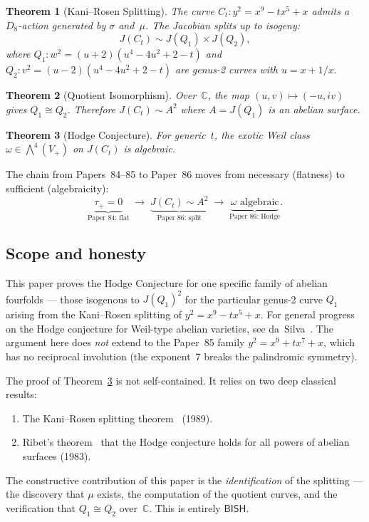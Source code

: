 \documentclass[11pt]{article}
\theoremstyle{plain}
\newtheorem{theorem}{Theorem}[section]
\theoremstyle{definition}
\theoremstyle{remark}
\newcommand{\C}{\mathbb{C}}
\newcommand{\BISH}{\ensuremath{\mathsf{BISH}}}
\begin{document}
\begin{theorem}[Kani--Rosen Splitting]\label{thm:A}
The curve $C_t\colon y^2 = x^9 - tx^5 + x$ admits a $D_8$-action
generated by $\sigma$ and~$\mu$.  The Jacobian splits up to isogeny:
\[
  J(C_t) \sim J(Q_1) \times J(Q_2),
\]
where $Q_1\colon w^2 = (u+2)(u^4 - 4u^2 + 2 - t)$ and
$Q_2\colon v^2 = (u-2)(u^4 - 4u^2 + 2 - t)$ are genus-2 curves
with $u = x + 1/x$.
\end{theorem}

\begin{theorem}[Quotient Isomorphism]\label{thm:B}
Over~$\C$, the map $(u,v) \mapsto (-u, iv)$ gives $Q_1 \cong Q_2$.
Therefore $J(C_t) \sim A^2$ where $A = J(Q_1)$ is an abelian surface.
\end{theorem}

\begin{theorem}[Hodge Conjecture]\label{thm:C}
For generic~$t$, the exotic Weil class
$\omega \in \bigwedge^4(V_+)$ on $J(C_t)$ is algebraic.
\end{theorem}

The chain from Papers~84--85 to Paper~86 moves from necessary
(flatness) to sufficient (algebraicity):
\[
  \underbrace{\tau_+ = 0}_{\text{Paper 84: flat}}
  \;\longrightarrow\;
  \underbrace{J(C_t) \sim A^2}_{\text{Paper 86: split}}
  \;\longrightarrow\;
  \underbrace{\omega \text{ algebraic}}_{\text{Paper 86: Hodge}}.
\]

\subsection{Scope and honesty}

This paper proves the Hodge Conjecture for one specific family of
abelian fourfolds --- those isogenous to $J(Q_1)^2$ for the
particular genus-2 curve $Q_1$ arising from the Kani--Rosen
splitting of $y^2 = x^9 - tx^5 + x$.  For general progress on the
Hodge conjecture for Weil-type abelian varieties,
see da~Silva~\cite{daSilva21}.
The argument here does \emph{not}
extend to the Paper~85 family $y^2 = x^9 + tx^7 + x$, which has
no reciprocal involution (the exponent~7 breaks the palindromic
symmetry).

The proof of Theorem~\ref{thm:C} is not self-contained.
It relies on two deep classical results:
\begin{enumerate}[label=(\roman*)]
  \item The Kani--Rosen splitting theorem~\cite{KR89} (1989).
  \item Ribet's theorem~\cite{Ribet83} that the Hodge conjecture
        holds for all powers of abelian surfaces (1983).
\end{enumerate}
The constructive contribution of this paper is the \emph{identification}
of the splitting --- the discovery that $\mu$ exists, the computation
of the quotient curves, and the verification that $Q_1 \cong Q_2$
over~$\C$.  This is entirely \BISH.
\end{document}
